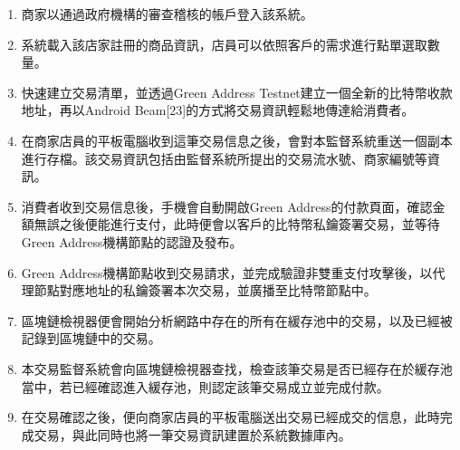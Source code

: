 	\begin{enumerate}
		\item 商家以通過政府機構的審查稽核的帳戶登入該系統。
		\item 系統載入該店家註冊的商品資訊，店員可以依照客戶的需求進行點單選取數量。
		\item 快速建立交易清單，並透過Green Address Testnet建立一個全新的比特幣收款地址，再以Android Beam[23]的方式將交易資訊輕鬆地傳達給消費者。
		\item 在商家店員的平板電腦收到這筆交易信息之後，會對本監督系統重送一個副本進行存檔。該交易資訊包括由監督系統所提出的交易流水號、商家編號等資訊。
		\item 消費者收到交易信息後，手機會自動開啟Green Address的付款頁面，確認金額無誤之後便能進行支付，此時便會以客戶的比特幣私鑰簽署交易，並等待Green Address機構節點的認證及發布。
		\item Green Address機構節點收到交易請求，並完成驗證非雙重支付攻擊後，以代理節點對應地址的私鑰簽署本次交易，並廣播至比特幣節點中。
		\item 區塊鏈檢視器便會開始分析網路中存在的所有在緩存池中的交易，以及已經被記錄到區塊鏈中的交易。
		\item 本交易監督系統會向區塊鏈檢視器查找，檢查該筆交易是否已經存在於緩存池當中，若已經確認進入緩存池，則認定該筆交易成立並完成付款。
		\item 在交易確認之後，便向商家店員的平板電腦送出交易已經成交的信息，此時完成交易，與此同時也將一筆交易資訊建置於系統數據庫內。
	\end{enumerate}